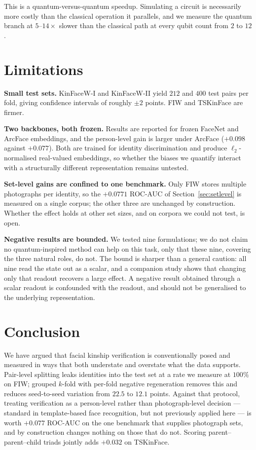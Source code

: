 \documentclass[preprint,12pt]{elsarticle}
\begin{document}
This is a quantum-versus-quantum speedup. Simulating a circuit is necessarily
more costly than the classical operation it parallels, and we measure the
quantum branch at $5$--$14\times$ slower than the classical path at every qubit
count from $2$ to $12$.

\section{Limitations}
\label{sec:limitations}

\textbf{Small test sets.} KinFaceW-I and KinFaceW-II yield $212$ and $400$ test
pairs per fold, giving confidence intervals of roughly $\pm 2$ points. FIW and
TSKinFace are firmer.

\textbf{Two backbones, both frozen.} Results are reported for frozen
FaceNet and ArcFace embeddings, and the person-level gain is larger under
ArcFace ($+0.098$ against $+0.077$). Both are trained for identity
discrimination and produce $\ell_2$-normalised real-valued embeddings, so
whether the biases we quantify interact with a structurally different
representation remains untested.

\textbf{Set-level gains are confined to one benchmark.} Only FIW stores
multiple photographs per identity, so the $+0.0771$ ROC-AUC of
Section~\ref{sec:setlevel} is measured on a single corpus; the other three are
unchanged by construction. Whether the effect holds at other set sizes, and on
corpora we could not test, is open.

\textbf{Negative results are bounded.} We tested nine formulations; we do not
claim no quantum-inspired method can help on this task, only that these nine,
covering the three natural roles, do not. The bound is sharper than a general
caution: all nine read the state out as a scalar, and a companion study shows
that changing only that readout recovers a large effect. A negative result
obtained through a scalar readout is confounded with the readout, and should
not be generalised to the underlying representation.

\section{Conclusion}

We have argued that facial kinship verification is conventionally posed and
measured in ways that both understate and overstate what the data supports.
Pair-level splitting leaks identities into the test set at a rate we measure at
$100\%$ on FIW; grouped $k$-fold with per-fold negative regeneration removes
this and reduces seed-to-seed variation from $22.5$ to $12.1$ points. Against
that protocol, treating verification as a person-level rather than
photograph-level decision --- standard in template-based face recognition, but
not previously applied here --- is worth $+0.077$ ROC-AUC on the one benchmark
that supplies photograph sets, and by construction changes nothing on those
that do not. Scoring parent--parent--child triads jointly adds $+0.032$ on
TSKinFace.
\end{document}
